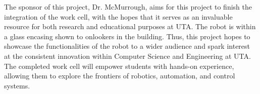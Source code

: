 The sponsor of this project, Dr. McMurrough, aims for this project to finish the integration of the work cell, with the hopes that it serves as an invaluable resource for both research and educational purposes at UTA. The robot is within a glass encasing shown to onlookers in the building. Thus, this project hopes to showcase the functionalities of the robot to a wider audience and spark interest at the consistent innovation within Computer Science and Engineering at UTA. The completed work cell will empower students with hands-on experience, allowing them to explore the frontiers of robotics, automation, and control systems. 

